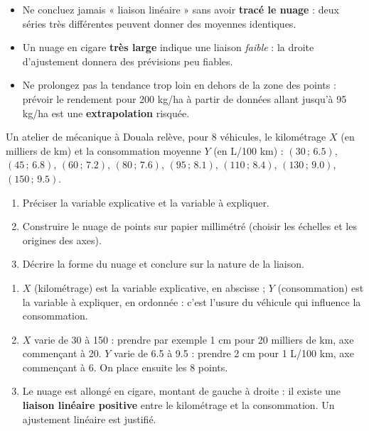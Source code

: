\documentclass[11pt]{article}
\begin{document}
\begin{attention}
\begin{itemize}
\item Ne concluez jamais « liaison linéaire » sans avoir \textbf{tracé le nuage} : deux séries très différentes peuvent donner des moyennes identiques.
\item Un nuage en cigare \textbf{très large} indique une liaison \emph{faible} : la droite d'ajustement donnera des prévisions peu fiables.
\item Ne prolongez pas la tendance trop loin en dehors de la zone des points : prévoir le rendement pour 200 kg/ha à partir de données allant jusqu'à 95 kg/ha est une \textbf{extrapolation} risquée.
\end{itemize}
\end{attention}

\begin{exercice}
Un atelier de mécanique à Douala relève, pour 8 véhicules, le kilométrage $X$ (en milliers de km) et la consommation moyenne $Y$ (en L/100 km) : $(30\,;\,\num{6,5})$, $(45\,;\,\num{6,8})$, $(60\,;\,\num{7,2})$, $(80\,;\,\num{7,6})$, $(95\,;\,\num{8,1})$, $(110\,;\,\num{8,4})$, $(130\,;\,\num{9,0})$, $(150\,;\,\num{9,5})$.
\begin{enumerate}
\item Préciser la variable explicative et la variable à expliquer.
\item Construire le nuage de points sur papier millimétré (choisir les échelles et les origines des axes).
\item Décrire la forme du nuage et conclure sur la nature de la liaison.
\end{enumerate}
\end{exercice}

\begin{corrige}
\begin{enumerate}
\item $X$ (kilométrage) est la variable explicative, en abscisse ; $Y$ (consommation) est la variable à expliquer, en ordonnée : c'est l'usure du véhicule qui influence la consommation.
\item $X$ varie de 30 à 150 : prendre par exemple 1 cm pour 20 milliers de km, axe commençant à 20. $Y$ varie de \num{6,5} à \num{9,5} : prendre 2 cm pour 1 L/100 km, axe commençant à 6. On place ensuite les 8 points.
\item Le nuage est allongé en cigare, montant de gauche à droite : il existe une \textbf{liaison linéaire positive} entre le kilométrage et la consommation. Un ajustement linéaire est justifié.
\end{enumerate}
\end{corrige}
\end{document}
